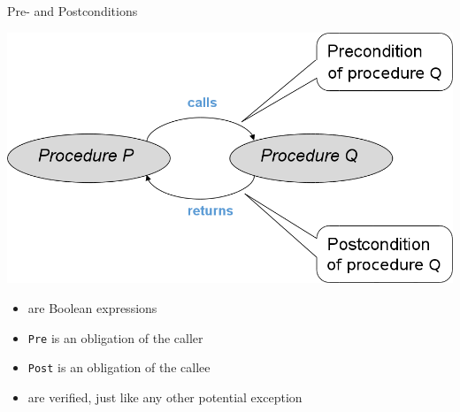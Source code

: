 \begin{frame}[fragile]{Pre- and Postconditions}
  \begin{center}
    \includegraphics[width=.8\textwidth]{content/images/spark/pre-post}    
  \end{center}
\vspace{-2em}
  \begin{itemize}
  \item are Boolean expressions
  \item \texttt{Pre} is an obligation of the caller
  \item \texttt{Post} is an obligation of the callee
  \item \alert{are verified, just like any other potential exception}
  \end{itemize}
\end{frame}
\addtocounter{clock}{2}


